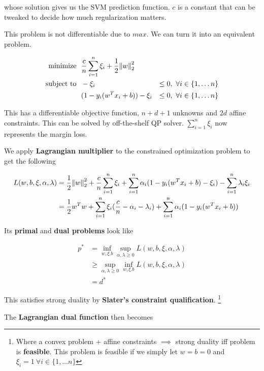 \documentclass{article}
\DeclareMathOperator*{\minf}{inf}
\DeclareMathOperator*{\msup}{sup}
\begin{document}
whose solution gives us the SVM prediction function.
$c$ is a constant that can be tweaked to decide how much regularization matters.

This problem is not differentiable due to $max$.
We can turn it into an equivalent problem.

\begin{align*}
\text{minimize}   ~~& \frac{c}{n} \sum_{i = 1}^{n}{\xi_i} + \frac{1}{2} {\norm{w}_2^2} \\
\text{subject to} ~~& -\xi_i &\leq 0, ~ \forall i \in \{1, \dots n\} \\
                  & (1 - y_i (w^{T} x_i + b)) - \xi_i &\leq 0, ~ \forall i \in \{1, \dots n\}
\end{align*}

This has a differentiable objective function, $n + d + 1$ unknowns and $2 d$ affine constraints.
This can be solved by off-the-shelf QP solver.
$\sum_{i = 1}^{n}{\xi_i}$ now represents the margin loss.

We apply \textbf{Lagrangian multiplier} to the constrained optimization problem to get the following

\begin{align*}
L(w, b, \xi, \alpha, \lambda) &= \frac{1}{2} {\norm{w}_2^2} + \frac{c}{n} \sum_{i = 1}^{n}{\xi_i} + \sum_{i = 1}^{n}{\alpha_i (1 - y_i (w^{T} x_i + b) - \xi_i)} - \sum_{i = 1}^{n}{\lambda_i \xi_i} \\
                              &= \frac{1}{2} w^{T} w + \sum_{i = 1}^{n}{\xi_i (\frac{c}{n} - \alpha_i - \lambda_i)} + \sum_{i = 1}^{n}{\alpha_i (1 - y_i (w^{T} x_i + b))}
\end{align*}

Its \textbf{primal} and \textbf{dual problems} look like

\begin{align*}
p^* &= \minf_{w, \xi. b} \msup_{\alpha, \lambda \geq 0} L(w, b, \xi, \alpha, \lambda) \\
    &\geq \msup_{\alpha, \lambda \geq 0} \minf_{w, \xi. b} L(w, b, \xi, \alpha, \lambda) \\
    &= d^*
\end{align*}

This satisfies strong duality by \textbf{Slater's constraint qualification}.
\footnote{Where a convex problem + affine constraints $\implies$ strong duality iff problem is \textbf{feasible}.
This problem is feasible if we simply let $w = b = 0$ and $\xi_i = 1 ~ \forall i \in \{1, \dots n\}$}

The \textbf{Lagrangian dual function} then becomes
\end{document}
